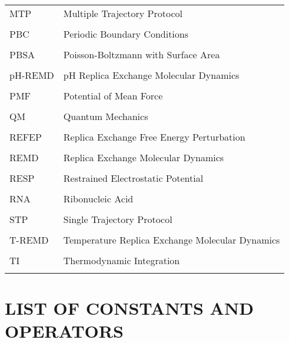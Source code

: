 \begin{tabular}{lp{5in}}

MTP & Multiple Trajectory Protocol \\ \\

PBC & Periodic Boundary Conditions \\ \\

PBSA & Poisson-Boltzmann with Surface Area \\ \\

pH-REMD & pH Replica Exchange Molecular Dynamics \\ \\

PMF & Potential of Mean Force \\ \\

QM & Quantum Mechanics \\ \\

REFEP & Replica Exchange Free Energy Perturbation \\ \\

REMD & Replica Exchange Molecular Dynamics \\ \\

RESP & Restrained Electrostatic Potential \\ \\

RNA & Ribonucleic Acid \\ \\

STP & Single Trajectory Protocol \\ \\

T-REMD & Temperature Replica Exchange Molecular Dynamics \\ \\

TI & Thermodynamic Integration \\ \\

\end{tabular}

\chapter*{LIST OF CONSTANTS AND OPERATORS}

